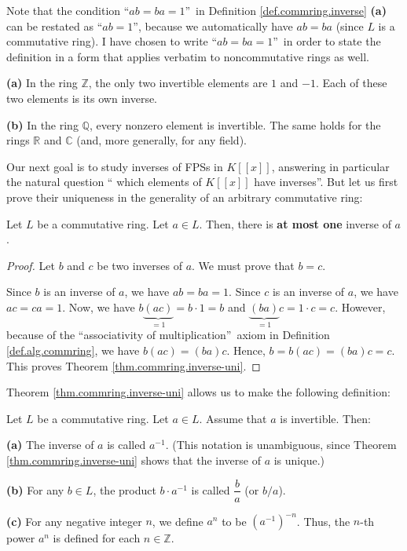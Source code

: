 Note that the condition \textquotedblleft$ab=ba=1$\textquotedblright\ in
Definition \ref{def.commring.inverse} \textbf{(a)} can be restated as
\textquotedblleft$ab=1$\textquotedblright, because we automatically have
$ab=ba$ (since $L$ is a commutative ring). I have chosen to write
\textquotedblleft$ab=ba=1$\textquotedblright\ in order to state the definition
in a form that applies verbatim to noncommutative rings as well.

\begin{example}
\textbf{(a)} In the ring $\mathbb{Z}$, the only two invertible elements are
$1$ and $-1$. Each of these two elements is its own inverse. \medskip

\textbf{(b)} In the ring $\mathbb{Q}$, every nonzero element is invertible.
The same holds for the rings $\mathbb{R}$ and $\mathbb{C}$ (and, more
generally, for any field).
\end{example}

Our next goal is to study inverses of FPSs in $K\left[  \left[  x\right]
\right]  $, answering in particular the natural question \textquotedblleft
which elements of $K\left[  \left[  x\right]  \right]  $ have
inverses\textquotedblright. But let us first prove their uniqueness in the
generality of an arbitrary commutative ring:

\begin{theorem}
\label{thm.commring.inverse-uni}Let $L$ be a commutative ring. Let $a\in L$.
Then, there is \textbf{at most one} inverse of $a$.
\end{theorem}

\begin{proof}
Let $b$ and $c$ be two inverses of $a$. We must prove that $b=c$.

Since $b$ is an inverse of $a$, we have $ab=ba=1$. Since $c$ is an inverse of
$a$, we have $ac=ca=1$. Now, we have $b\underbrace{\left(  ac\right)  }%
_{=1}=b\cdot1=b$ and $\underbrace{\left(  ba\right)  }_{=1}c=1\cdot c=c$.
However, because of the \textquotedblleft associativity of
multiplication\textquotedblright\ axiom in Definition \ref{def.alg.commring},
we have $b\left(  ac\right)  =\left(  ba\right)  c$. Hence, $b=b\left(
ac\right)  =\left(  ba\right)  c=c$. This proves Theorem
\ref{thm.commring.inverse-uni}.
\end{proof}

Theorem \ref{thm.commring.inverse-uni} allows us to make the following definition:

\begin{definition}
\label{def.commring.fracs}Let $L$ be a commutative ring. Let $a\in L$. Assume
that $a$ is invertible. Then: \medskip

\textbf{(a)} The inverse of $a$ is called $a^{-1}$. (This notation is
unambiguous, since Theorem \ref{thm.commring.inverse-uni} shows that the
inverse of $a$ is unique.) \medskip

\textbf{(b)} For any $b\in L$, the product $b\cdot a^{-1}$ is called
$\dfrac{b}{a}$ (or $b/a$). \medskip

\textbf{(c)} For any negative integer $n$, we define $a^{n}$ to be $\left(
a^{-1}\right)  ^{-n}$. Thus, the $n$-th power $a^{n}$ is defined for each
$n\in\mathbb{Z}$.
\end{definition}

